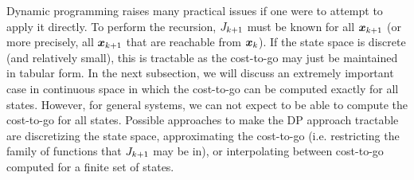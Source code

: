 Dynamic programming raises many practical issues if one were to attempt to apply it directly. To perform the recursion, $J_{k+1}$ must be known for all $\bm{x}_{k+1}$ (or more precisely, all $\bm{x}_{k+1}$ that are reachable from $\bm{x}_k$). If the state space is discrete (and relatively small), this is tractable as the cost-to-go may just be maintained in tabular form. In the next subsection, we will discuss an extremely important case in continuous space in which the cost-to-go can be computed exactly for all states. However, for general systems, we can not expect to be able to compute the cost-to-go for all states. Possible approaches to make the DP approach tractable are discretizing the state space, approximating the cost-to-go (i.e. restricting the family of functions that $J_{k+1}$ may be in), or interpolating between cost-to-go computed for a finite set of states. 




